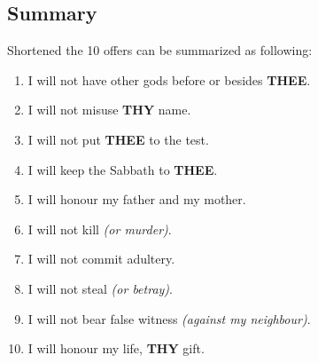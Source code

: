 \documentclass[12pt,a4paper]{article}
\newcommand{\Thee}[0]{\textbf{THEE}}
\newcommand{\Thy}[0]{\textbf{THY}}
\begin{document}
	\subsection{Summary}
		Shortened the 10 offers can be summarized as following:
		\\
		\begin{enumerate}[nosep]
			\item I will not have other gods before or besides {\Thee}.
			\item I will not misuse {\Thy} name.
			\item I will not put {\Thee} to the test.
			\item I will keep the Sabbath to {\Thee}.
			\item I will honour my father and my mother.
			\item I will not kill \textit{(or murder)}.
			\item I will not commit adultery.
			\item I will not steal \textit{(or betray)}.
			\item I will not bear false witness \textit{(against my neighbour)}.
			\item I will honour my life, {\Thy} gift.
		\end{enumerate}
		
\end{document}
